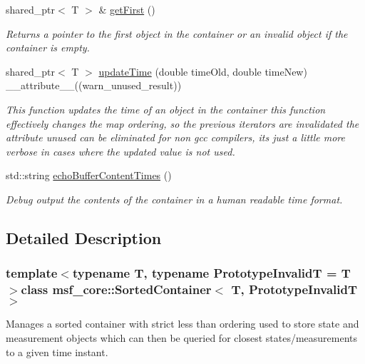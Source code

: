 \begin{DoxyCompactItemize}
shared\-\_\-ptr$<$ T $>$ \& \hyperlink{classmsf__core_1_1SortedContainer_a7cce297c5a4bbf80d617741fe3dc902e}{get\-First} ()
\begin{DoxyCompactList}\small\item\em Returns a pointer to the first object in the container or an invalid object if the container is empty. \end{DoxyCompactList}\item 
shared\-\_\-ptr$<$ T $>$ \hyperlink{classmsf__core_1_1SortedContainer_a7e4c594bb1aec9d6d4d8fb73e7baff9a}{update\-Time} (double time\-Old, double time\-New) \-\_\-\-\_\-attribute\-\_\-\-\_\-((warn\-\_\-unused\-\_\-result))
\begin{DoxyCompactList}\small\item\em This function updates the time of an object in the container this function effectively changes the map ordering, so the previous iterators are invalidated the attribute unused can be eliminated for non gcc compilers, its just a little more verbose in cases where the updated value is not used. \end{DoxyCompactList}\item 
std\-::string \hyperlink{classmsf__core_1_1SortedContainer_a7cecf8583999a5b457e04d5ef781dc5d}{echo\-Buffer\-Content\-Times} ()
\begin{DoxyCompactList}\small\item\em Debug output the contents of the container in a human readable time format. \end{DoxyCompactList}\end{DoxyCompactItemize}


\subsection{Detailed Description}
\subsubsection*{template$<$typename T, typename Prototype\-Invalid\-T = T$>$class msf\-\_\-core\-::\-Sorted\-Container$<$ T, Prototype\-Invalid\-T $>$}

Manages a sorted container with strict less than ordering used to store state and measurement objects which can then be queried for closest states/measurements to a given time instant. 

